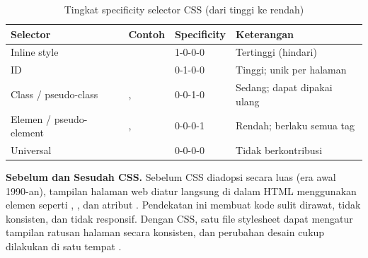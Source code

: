 \begin{table}[H]
\centering
\begin{tabular}{|P{3cm}|P{2.5cm}|P{3cm}|P{3.5cm}|}
\hline
\textbf{Selector} & \textbf{Contoh} & \textbf{Specificity} & \textbf{Keterangan} \\
\hline
Inline style &  & 1-0-0-0 & Tertinggi (hindari) \\
\hline
ID &  & 0-1-0-0 & Tinggi; unik per halaman \\
\hline
Class / pseudo-class & ,  & 0-0-1-0 & Sedang; dapat dipakai ulang \\
\hline
Elemen / pseudo-element & ,  & 0-0-0-1 & Rendah; berlaku semua tag \\
\hline
Universal & \code{*} & 0-0-0-0 & Tidak berkontribusi \\
\hline
\end{tabular}
\caption{Tingkat specificity selector CSS (dari tinggi ke rendah)}
\end{table}

\begin{konsep}
\textbf{Sebelum dan Sesudah CSS.} Sebelum CSS diadopsi secara luas (era awal 1990-an), tampilan halaman web diatur langsung di dalam HTML menggunakan elemen seperti , , dan atribut . Pendekatan ini membuat kode sulit dirawat, tidak konsisten, dan tidak responsif. Dengan CSS, satu file stylesheet dapat mengatur tampilan ratusan halaman secara konsisten, dan perubahan desain cukup dilakukan di satu tempat \cite{cssTricks}.
\end{konsep}


